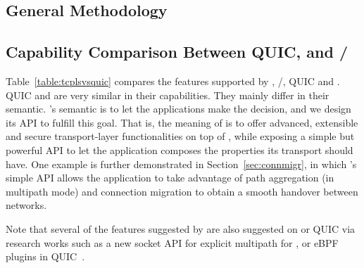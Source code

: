 \subsection{General Methodology}


\subsection{Capability Comparison Between QUIC, \tcp and \tls/\tcp}

Table~\ref{table:tcplsvsquic} compares the features supported by
\tcp, \tls/\tcp, QUIC and \tcpls. QUIC and \tcpls are very similar in their
capabilities. They mainly differ in their semantic. \tcpls's semantic is to let
the applications make the decision, and we design its API to fulfill this goal.
That is, the meaning of \tcpls is to offer advanced, extensible and secure
transport-layer functionalities on top of \tcp, while exposing a simple but
powerful API to let the application composes the properties its transport should
have. One example is further demonstrated in Section~\ref{sec:connmigr}, in
which \tcpls's simple API allows the application to take advantage of path
aggregation (in multipath mode) and connection migration to obtain
a smooth handover between networks.

Note that several of the features suggested by \tcpls are also suggested on \tcp or
QUIC via research works such as a new socket API for explicit multipath for
\tcp\cite{hesmans2016enhanced}, or eBPF plugins in
QUIC~\cite{de2019pluginizing}.

